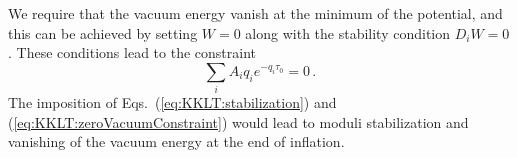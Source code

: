 \documentclass[12pt]{article}
\begin{document}



We require that the vacuum energy vanish at the minimum of the potential, and this can be achieved by setting $W = 0$ along with the stability condition $D_i W = 0$.
These conditions lead to the constraint
\begin{equation} \label{eq:KKLT:zeroVacuumConstraint}
  \sum_i A_i q_i e^{-q_i \tau_0} = 0\,.
\end{equation}
The imposition of Eqs.~(\ref{eq:KKLT:stabilization}) and (\ref{eq:KKLT:zeroVacuumConstraint}) would lead to moduli stabilization and vanishing of the vacuum energy at the end of inflation.

\end{document}
